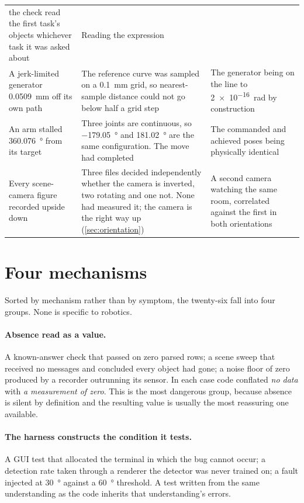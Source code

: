 \begin{table}[htbp]
\begin{tabular}{@{}p{32mm}p{45mm}p{45mm}@{}}
        the check read the first task's objects whichever task it was asked
        about
      & Reading the expression \\
    A jerk-limited generator \SI{0.0509}{\milli\metre} off its own path
      & The reference curve was sampled on a \SI{0.1}{\milli\metre} grid, so
        nearest-sample distance could not go below half a grid step
      & The generator being on the line to \SI{2e-16}{\radian} by construction \\
    An arm stalled \SI{360.076}{\degree} from its target
      & Three joints are continuous, so \SI{-179.05}{\degree} and
        \SI{181.02}{\degree} are the same configuration. The move had
        completed
      & The commanded and achieved poses being physically identical \\
    Every scene-camera figure recorded upside down
      & Three files decided independently whether the camera is inverted,
        two rotating and one not. None had measured it; the camera is the
        right way up (\cref{sec:orientation})
      & A second camera watching the same room, correlated against the first
        in both orientations \\
    \bottomrule
  \end{tabular}
\end{table}

\section{Four mechanisms}

Sorted by mechanism rather than by symptom, the twenty-six fall into four
groups. None is specific to robotics.

\paragraph{Absence read as a value.} A known-answer check that passed on zero
parsed rows; a scene sweep that received no messages and concluded every
object had gone; a noise floor of zero produced by a recorder outrunning its
sensor. In each case code conflated \emph{no data} with \emph{a measurement of
zero}. This is the most dangerous group, because absence is silent by
definition and the resulting value is usually the most reassuring one
available.

\paragraph{The harness constructs the condition it tests.} A GUI test that
allocated the terminal in which the bug cannot occur; a detection rate taken
through a renderer the detector was never trained on; a fault injected at
\SI{30}{\degree} against a \SI{60}{\degree} threshold. A test written from the
same understanding as the code inherits that understanding's errors.


